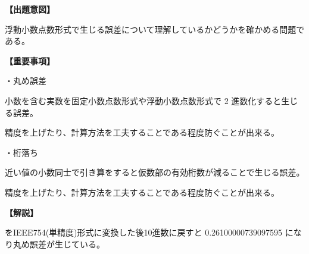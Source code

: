 \noindent \textbf{【出題意図】}

\noindent 浮動小数点数形式で生じる誤差について理解しているかどうかを確かめる問題である。

\vspace{1em}
\noindent \textbf{【重要事項】}

\medskip
\noindent ・丸め誤差

\medskip
\noindent 小数を含む実数を固定小数点数形式や浮動小数点数形式で 2 進数化すると生じる誤差。

\noindent 精度を上げたり、計算方法を工夫することである程度防ぐことが出来る。

\medskip
\noindent ・桁落ち

\medskip
\noindent 近い値の小数同士で引き算をすると仮数部の有効桁数が減ることで生じる誤差。

\noindent 精度を上げたり、計算方法を工夫することである程度防ぐことが出来る。


\vspace{1em}
\noindent \textbf{【解説】}

 をIEEE754(単精度)形式に変換した後10進数に戻すと 0.26100000739097595 になり丸め誤差が生じている。
